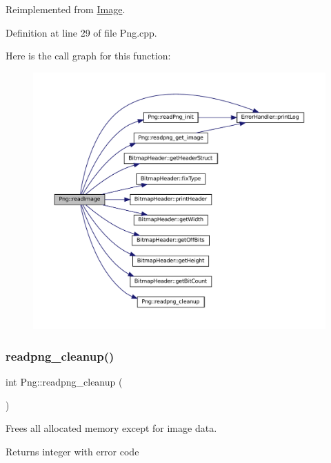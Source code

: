 Reimplemented from \mbox{\hyperlink{classImage_ac0aa1f41cb368d87b20dd38839218d93}{Image}}.



Definition at line 29 of file Png.\+cpp.

Here is the call graph for this function\+:\nopagebreak
\begin{figure}[H]
\begin{center}
\leavevmode
\includegraphics[width=350pt]{classPng_aa38d2a6baa44bd0b3a932b93ee67e419_cgraph}
\end{center}
\end{figure}
\mbox{\label{classPng_a0988d572e9fd30100d1976f675028fea}} 
\subsubsection{\texorpdfstring{readpng\_cleanup()}{readpng\_cleanup()}}
{\footnotesize\ttfamily int Png\+::readpng\+\_\+cleanup (\begin{DoxyParamCaption}{ }\end{DoxyParamCaption})\hspace{0.3cm}{\ttfamily [private]}}



Frees all allocated memory except for image data. 

\begin{DoxyReturn}{Returns}
integer with error code 
\end{DoxyReturn}


